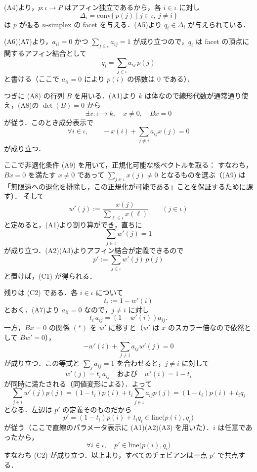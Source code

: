 \documentclass[a4paper,12pt]{bxjsbook}
\makeatletter
\newlength{\customindent}
\theoremstyle{theorem}
\renewenvironment{proof}[1][\proofname]{%
  \par\pushQED{\qed}%
  \normalfont
  \topsep6\p@\@plus6\p@\relax
  \list{}{%
    \leftmargin=\customindent
    \rightmargin=0pt
    \labelwidth=0pt
    \labelsep=0pt
    \itemindent=0pt
    \listparindent=0pt
    \parsep=0pt
  }%
  \item[\itshape #1\@addpunct{.}\hspace{0.5em}]%
  \setlength{\displayindent}{\customindent}%
  \setlength{\displaywidth}{\dimexpr\linewidth-\customindent\relax}%
  \ignorespaces
}{%
  \popQED\endlist\@endpefalse
}
\makeatother
\begin{document}
    \begin{proof}
        (A4)より，$p:\iota\to P$ はアフィン独立であるから，各 $i\in\iota$ に対し
        \[
        \Delta_i=\mathrm{conv}\{\,p(j)\mid j\in\iota,\ j\neq i\,\}
        \]
        は $p$ が張る $n$-simplex の facet を与える．(A5)より $q_i\in\Delta_i$ が与えられている．
        
        (A6)(A7)より，$a_{ii}=0$ かつ $\sum_{j\in\iota}a_{ij}=1$ が成り立つので，$q_i$ は facet の頂点に関するアフィン結合として
        \[
        q_i=\sum_{j\in\iota} a_{ij}\,p(j)
        \]
        と書ける（ここで $a_{ii}=0$ により $p(i)$ の係数は $0$ である）．
        
        つぎに (A8) の行列 $B$ を用いる．(A1)より $k$ は体なので線形代数が通常通り使え，(A8)の $\det(B)=0$ から
        \[
        \exists x:\iota\to k,\quad x\neq 0,\quad Bx=0
        \]
        が従う．このとき成分表示で
        \[
        \forall i\in\iota,\qquad -x(i)+\sum_{j\neq i} a_{ij}x(j)=0
        \tag{$\ast$}
        \]
        が成り立つ．
        
        ここで非退化条件 (A9) を用いて，正規化可能な核ベクトルを取る：
        すなわち，$Bx=0$ を満たす $x\neq 0$ であって $\sum_{j\in\iota}x(j)\neq 0$ となるものを選ぶ（(A9) は「無限遠への退化を排除し，この正規化が可能である」ことを保証するために課す）．
        そして
        \[
        w'(j):=\frac{x(j)}{\sum_{\ell\in\iota}x(\ell)}\qquad(j\in\iota)
        \]
        と定めると，(A1)より割り算ができ，直ちに
        \[
        \sum_{j\in\iota}w'(j)=1
        \]
        が成り立つ．(A2)(A3)よりアフィン結合が定義できるので
        \[
        p':=\sum_{j\in\iota} w'(j)\,p(j)
        \]
        と置けば，(C1) が得られる．
        
        残りは (C2) である．各 $i\in\iota$ について
        \[
        t_i:=1-w'(i)
        \]
        とおく．(A7)より $a_{ii}=0$ なので，$j\neq i$ に対し
        \[
        t_i\,a_{ij}=(1-w'(i))a_{ij}.
        \]
        一方，$Bx=0$ の関係 $(\ast)$ を $w'$ に移すと（$w'$ は $x$ のスカラー倍なので依然として $Bw'=0$），
        \[
        -w'(i)+\sum_{j\neq i}a_{ij}w'(j)=0
        \]
        が成り立つ．この等式と $\sum_j a_{ij}=1$ を合わせると，$j\neq i$ に対して
        \[
        w'(j)=t_i\,a_{ij}
        \quad\text{および}\quad
        w'(i)=1-t_i
        \]
        が同時に満たされる（同値変形による）．よって
        \[
        \sum_{j\in\iota} w'(j)p(j)
        =
        (1-t_i)p(i)+t_i\sum_{j\in\iota} a_{ij}p(j)
        =
        (1-t_i)p(i)+t_i q_i
        \]
        となる．左辺は $p'$ の定義そのものだから
        \[
        p'=(1-t_i)p(i)+t_i q_i \in \mathrm{line}\bigl(p(i),q_i\bigr)
        \]
        が従う（ここで直線のパラメータ表示に (A1)(A2)(A3) を用いた）．$i$ は任意であったから，
        \[
        \forall i\in\iota,\quad p'\in \mathrm{line}\bigl(p(i),q_i\bigr)
        \]
        すなわち (C2) が成り立つ．以上より，すべてのチェビアンは一点 $p'$ で共点する．
    \end{proof}
\end{document}
